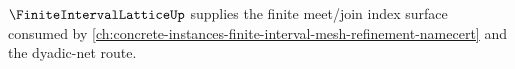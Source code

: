 $\FiniteIntervalLatticeUp$ supplies the finite meet/join index surface consumed by \autoref{ch:concrete-instances-finite-interval-mesh-refinement-namecert} and the dyadic-net route.




